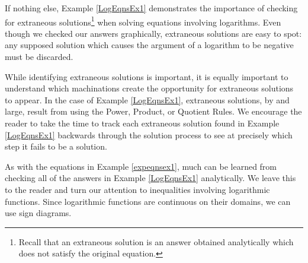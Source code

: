 \documentclass{ximera}
\begin{document}
If nothing else,  Example \ref{LogEqnsEx1} demonstrates the importance of checking for extraneous solutions\footnote{Recall that an extraneous solution is an answer obtained analytically which does not satisfy the original equation.} when solving equations involving logarithms.  Even though we checked our answers graphically, extraneous solutions are easy to spot:  any supposed solution which causes the argument of a logarithm to be negative must be discarded.  

While identifying extraneous solutions is important, it is equally important to understand which machinations create the opportunity for extraneous solutions to appear.  In the case of Example \ref{LogEqnsEx1}, extraneous solutions, by and large, result from using the Power, Product, or Quotient Rules.  We encourage the reader to take the time to track each extraneous solution found in  Example \ref{LogEqnsEx1}  backwards through the solution process to see at precisely which step it fails to be a solution.

As with the equations in Example \ref{expeqnsex1}, much can be learned from checking all of the answers in Example \ref{LogEqnsEx1} analytically.  We leave this to the reader and turn our attention to inequalities involving logarithmic functions.  Since logarithmic functions are continuous on their domains, we can use sign diagrams.  
\end{document}
